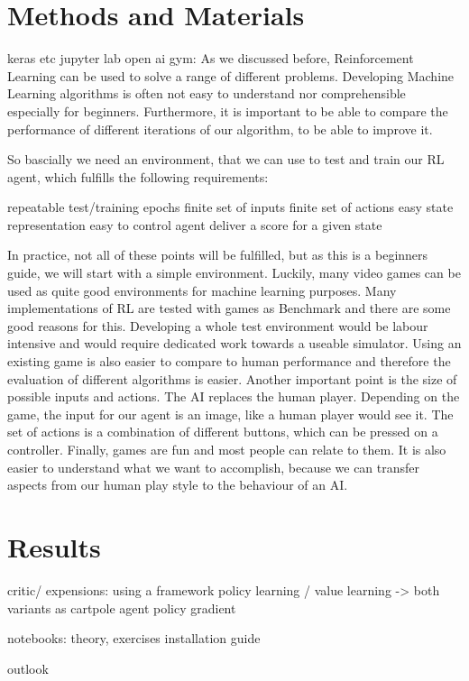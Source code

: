 \documentclass[a4paper]{article}
\begin{document}
	\section{Methods and Materials}
	
	keras etc
	jupyter lab
	open ai gym: 
		As we discussed before, Reinforcement Learning can be used to solve a range of different problems. Developing Machine Learning algorithms is often not easy to understand nor comprehensible especially for beginners. Furthermore, it is important to be able to compare the performance of different iterations of our algorithm, to be able to improve it.
		
		So bascially we need an environment, that we can use to test and train our RL agent, which fulfills the following requirements:
		
		repeatable test/training epochs
		finite set of inputs
		finite set of actions
		easy state representation
		easy to control agent
		deliver a score for a given state
		
		In practice, not all of these points will be fulfilled, but as this is a beginners guide, we will start with a simple environment. Luckily, many video games can be used as quite good environments for machine learning purposes. Many implementations of RL are tested with games as Benchmark and there are some good reasons for this. Developing a whole test environment would be labour intensive and would require dedicated work towards a useable simulator. Using an existing game is also easier to compare to human performance and therefore the evaluation of different algorithms is easier. Another important point is the size of possible inputs and actions. The AI replaces the human player. Depending on the game, the input for our agent is an image, like a human player would see it. The set of actions is a combination of different buttons, which can be pressed on a controller. Finally, games are fun and most people can relate to them. It is also easier to understand what we want to accomplish, because we can transfer aspects from our human play style to the behaviour of an AI. 

	
	\section{Results}
	critic/ expensions:
		using a framework
		policy learning / value learning -> both variants as cartpole agent
		policy gradient
	
	notebooks:
		theory, exercises
	installation guide
	
	outlook
	
	
\end{document}
